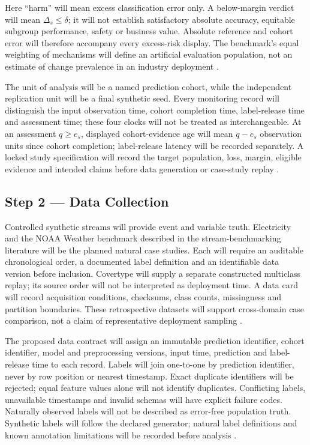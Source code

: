 Here ``harm'' will mean excess classification error only. A below-margin verdict will mean $\Delta_s\leq\delta$; it will not establish satisfactory absolute accuracy, equitable subgroup performance, safety or business value. Absolute reference and cohort error will therefore accompany every excess-risk display. The benchmark's equal weighting of mechanisms will define an artificial evaluation population, not an estimate of change prevalence in an industry deployment \cite{nist,souza}.

The unit of analysis will be a named prediction cohort, while the independent replication unit will be a final synthetic seed. Every monitoring record will distinguish the input observation time, cohort completion time, label-release time and assessment time; these four clocks will not be treated as interchangeable. At an assessment $q\geq e_s$, displayed cohort-evidence age will mean $q-e_s$ observation units since cohort completion; label-release latency will be recorded separately. A locked study specification will record the target population, loss, margin, eligible evidence and intended claims before data generation or case-study replay \cite{souza,nist}.

\subsection*{Step 2 --- Data Collection}
Controlled synthetic streams will provide event and variable truth. Electricity and the NOAA Weather benchmark described in the stream-benchmarking literature will be the planned natural case studies. Each will require an auditable chronological order, a documented label definition and an identifiable data version before inclusion. Covertype will supply a separate constructed multiclass replay; its source order will not be interpreted as deployment time. A data card will record acquisition conditions, checksums, class counts, missingness and partition boundaries. These retrospective datasets will support cross-domain case comparison, not a claim of representative deployment sampling \cite{souza}.

The proposed data contract will assign an immutable prediction identifier, cohort identifier, model and preprocessing versions, input time, prediction and label-release time to each record. Labels will join one-to-one by prediction identifier, never by row position or nearest timestamp. Exact duplicate identifiers will be rejected; equal feature values alone will not identify duplicates. Conflicting labels, unavailable timestamps and invalid schemas will have explicit failure codes. Naturally observed labels will not be described as error-free population truth. Synthetic labels will follow the declared generator; natural label definitions and known annotation limitations will be recorded before analysis \cite{awsjoin,souza}.

